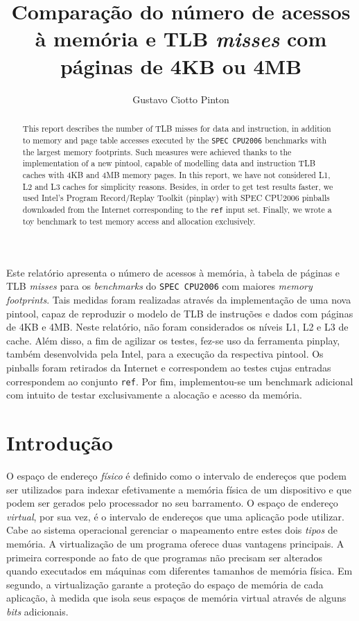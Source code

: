 \documentclass[12pt]{article}
\title{Comparação do número de acessos à memória e TLB \textit{misses} com
páginas de 4KB ou 4MB}
\author{Gustavo Ciotto Pinton\inst{1} }
\begin{document}
  

\maketitle

\begin{abstract}
This report describes the number of TLB misses for data and instruction,
in addition to memory and page table accesses executed by the \texttt{SPEC
CPU2006} benchmarks with the largest memory footprints. Such measures were
achieved thanks to the implementation of a new pintool, capable of modelling data and
instruction TLB caches with 4KB and 4MB memory pages. In this report, we have
not considered L1, L2 and L3 caches for simplicity reasons. Besides, in order to
get test results faster, we used Intel's Program Record/Replay Toolkit
(pinplay) with SPEC CPU2006 pinballs downloaded from the Internet corresponding
to the \texttt{ref} input set. Finally, we wrote a toy benchmark to test memory
access and allocation exclusively.
\end{abstract}
     
\begin{resumo} 
Este relatório apresenta o número de acessos à memória, à tabela de páginas e
TLB \textit{misses} para os \textit{benchmarks} do \texttt{SPEC
CPU2006} com maiores \textit{memory footprints}. Tais medidas foram
realizadas através da implementação de uma nova pintool, capaz de reproduzir o
modelo de TLB de instruções e dados com páginas de 4KB e 4MB. Neste relatório,
não foram considerados os níveis L1, L2 e L3 de cache. Além disso, a
fim de agilizar os testes, fez-se uso da ferramenta pinplay, também desenvolvida
pela Intel, para a execução da respectiva pintool. Os pinballs foram retirados
da Internet e correspondem ao testes cujas entradas correspondem ao conjunto
\texttt{ref}. Por fim, implementou-se um benchmark adicional com intuito de
testar exclusivamente a alocação e acesso da memória.
\end{resumo}

\section{Introdução}

O espaço de endereço \textit{físico} é definido como o intervalo de endereços
que podem ser utilizados para indexar efetivamente a memória física de um
dispositivo e que podem ser gerados pelo processador no seu barramento. O espaço
de endereço \textit{virtual}, por sua vez,  é o intervalo de endereços que uma
aplicação pode utilizar. Cabe ao sistema operacional gerenciar o mapeamento
entre estes dois \textit{tipos} de memória. A virtualização de um programa
oferece duas vantagens principais. A primeira corresponde ao fato de que
programas não precisam ser alterados quando executados em máquinas com
diferentes tamanhos de memória física. Em segundo, a virtualização garante a
proteção do espaço de memória de cada aplicação, à medida que isola seus espaços
de memória virtual através de alguns \textit{bits} adicionais. 
\end{document}
